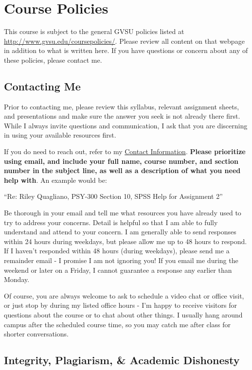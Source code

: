 \documentclass[
  12pt,
  letterpaper,
]{scrartcl}
\begin{document}
\section{Course Policies}\label{course-policies}

This course is subject to the general GVSU policies listed at
\url{http://www.gvsu.edu/coursepolicies/}. Please review all content on
that webpage in addition to what is written here. If you have questions
or concern about any of these policies, please contact me.

\subsection{Contacting Me}\label{contacting-me}

Prior to contacting me, please review this syllabus, relevant assignment
sheets, and presentations and make sure the answer you seek is not
already there first. While I always invite questions and communication,
I ask that you are discerning in using your available resources first.

If you do need to reach out, refer to my
\hyperref[contact-information]{Contact Information}. \textbf{Please
prioritize using email, and include your full name, course number, and
section number in the subject line, as well as a description of what you
need help with}. An example would be:

``Re: Riley Quagliano, PSY-300 Section 10, SPSS Help for Assignment 2''

Be thorough in your email and tell me what resources you have already
used to try to address your concerns. Detail is helpful so that I am
able to fully understand and attend to your concern. I am generally able
to send responses within 24 hours during weekdays, but please allow me
up to 48 hours to respond. If I haven't responded within 48 hours
(during weekdays), please send me a remainder email - I promise I am not
ignoring you! If you email me during the weekend or later on a Friday, I
cannot guarantee a response any earlier than Monday.

Of course, you are always welcome to ask to schedule a video chat or
office visit, or just stop by during my listed office hours - I'm happy
to receive visitors for questions about the course or to chat about
other things. I usually hang around campus after the scheduled course
time, so you may catch me after class for shorter conversations.

\subsection{Integrity, Plagiarism, \& Academic
Dishonesty}\label{integrity-plagiarism-academic-dishonesty}
\end{document}
